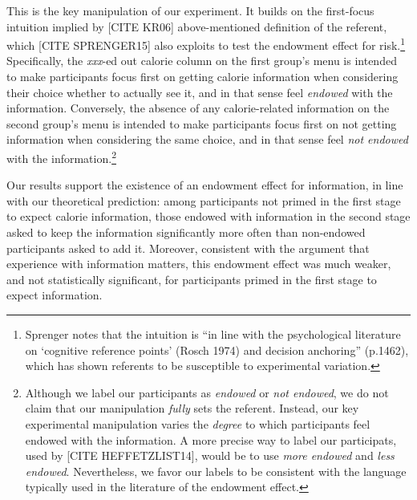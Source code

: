 \documentclass[12pt]{article}
\begin{document}
This is the key manipulation of our experiment. It builds on the first-focus intuition implied by [CITE KR06] above-mentioned definition of the referent, which [CITE SPRENGER15] also exploits to test the endowment effect for risk.\footnote{Sprenger notes that the intuition is \enquote{in line with the psychological literature on \enquote{cognitive reference points} (Rosch 1974) and decision anchoring} (p.1462), which has shown referents to be susceptible to experimental variation.} Specifically, the \emph{xxx}-ed out calorie column on the first group's menu is intended to make participants focus first on getting calorie information when considering their choice whether to actually see it, and in that sense feel \emph{endowed} with the information. Conversely, the absence of any calorie-related information on the second group's menu is intended to make participants focus first on not getting information when considering the same choice, and in that sense feel \emph{not endowed} with the information.\footnote{Although we label our participants as \emph{endowed} or \emph{not endowed}, we do not claim that our manipulation \emph{fully} sets the referent. Instead, our key experimental manipulation varies the \emph{degree} to which participants feel endowed with the information. A more precise way to label our participats, used by [CITE HEFFETZLIST14], would be to use \emph{more endowed} and \emph{less endowed}. Nevertheless, we favor our labels to be consistent with the language typically used in the literature of the endowment effect.}

Our results support the existence of an endowment effect for information, in line with our theoretical prediction: among participants not primed in the first stage to expect calorie information, those endowed with information in the second stage asked to keep the information significantly more often than non-endowed participants asked to add it. Moreover, consistent with the argument that experience with information matters, this endowment effect was much weaker, and not statistically significant, for participants primed in the first stage to expect information.
\end{document}

